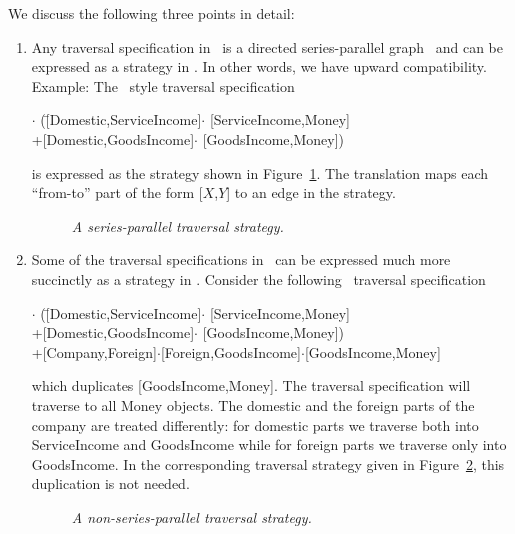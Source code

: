 We discuss the following three points in detail:
\begin{enumerate}
\item Any traversal specification in \OLD\ is a directed
      series-parallel graph~\cite{eppstein92parallel} and can be
      expressed as a strategy in \NEW.  In other words, we have upward
      compatibility.  Example: The \OLD\ style traversal specification
\begin{tabbing}
$\cdot$%
(\=[{\sf Domestic},{\sf ServiceIncome}]$\cdot$%
   [{\sf ServiceIncome},{\sf Money}]\\
\>+[{\sf Domestic},{\sf GoodsIncome}]$\cdot$%
   [{\sf GoodsIncome},{\sf Money}])
\end{tabbing} is expressed as the strategy shown in
Figure~\ref{fig-company-strat1}.  The translation maps each
``from-to'' part of the form [$X$,$Y$] to an edge in the strategy.
\begin{figure}
\centerline{}
\caption{\em A series-parallel traversal strategy.}
\label{fig-company-strat1}
\end{figure}

\item Some of the traversal specifications in \OLD\ can be expressed
      much more succinctly as a strategy in \NEW.  Consider the
      following \OLD\ traversal specification
\begin{tabbing}
$\cdot$%
(\=[{\sf Domestic},{\sf ServiceIncome}]$\cdot$%
   [{\sf ServiceIncome},{\sf Money}]\\
\>+[{\sf Domestic},{\sf GoodsIncome}]$\cdot$%
   [{\sf GoodsIncome},{\sf Money}])\\
+[{\sf Company},{\sf Foreign}]$\cdot$[{\sf Foreign},{\sf GoodsIncome}]$\cdot$[{\sf GoodsIncome},{\sf Money}]
\end{tabbing}
which duplicates [{\sf GoodsIncome},{\sf Money}].  The traversal
specification will traverse to all {\sf Money} objects. The domestic
and the foreign parts of the company are treated differently: for
domestic parts we traverse both into {\sf ServiceIncome} and {\sf
GoodsIncome} while for foreign parts we traverse only into {\sf
GoodsIncome}. In the corresponding traversal strategy given in
Figure~\ref{fig-company-strat2}, this duplication is not needed.
\begin{figure}
\centerline{}
\caption{\em A non-series-parallel traversal strategy.}
\label{fig-company-strat2}
\end{figure}


\end{enumerate}
